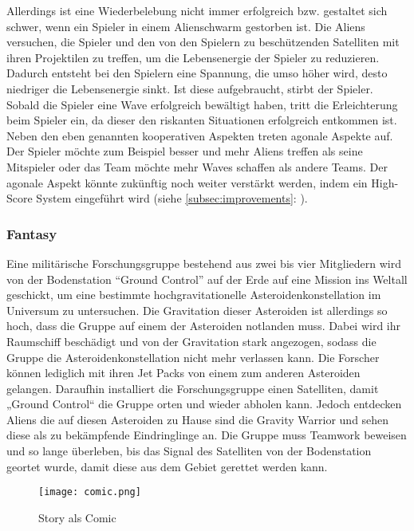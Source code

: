 \documentclass[11pt]{scrartcl}
\begin{document}
Allerdings ist eine Wiederbelebung nicht immer erfolgreich bzw. gestaltet sich schwer, wenn ein Spieler in einem Alienschwarm gestorben ist. Die Aliens versuchen, die Spieler und den von den Spielern zu beschützenden Satelliten mit ihren Projektilen zu treffen, um die Lebensenergie der Spieler zu reduzieren. Dadurch entsteht bei den Spielern eine Spannung, die umso höher wird, desto niedriger die Lebensenergie sinkt. Ist diese aufgebraucht, stirbt der Spieler. Sobald die Spieler eine Wave erfolgreich bewältigt haben, tritt die Erleichterung beim Spieler ein, da dieser den riskanten Situationen erfolgreich entkommen ist. Neben den eben genannten kooperativen Aspekten treten agonale Aspekte auf. Der Spieler möchte zum Beispiel besser und mehr Aliens treffen als seine Mitspieler oder das Team möchte mehr Waves schaffen als andere Teams. Der agonale Aspekt könnte zukünftig noch weiter verstärkt werden, indem ein High-Score System eingeführt wird (siehe \autoref{subsec:improvements}: ). 

\newpage
\subsubsection{Fantasy}
\label{subsec:fan}
Eine militärische Forschungsgruppe bestehend aus zwei bis vier Mitgliedern wird von der Bodenstation “Ground Control” auf der Erde auf eine Mission ins Weltall geschickt, um eine bestimmte hochgravitationelle Asteroidenkonstellation im Universum zu untersuchen. Die Gravitation dieser Asteroiden ist allerdings so hoch, dass die Gruppe auf einem der Asteroiden notlanden muss. Dabei wird ihr Raumschiff beschädigt und von der Gravitation stark angezogen, sodass die Gruppe die Asteroidenkonstellation nicht mehr verlassen kann. Die Forscher können lediglich mit ihren Jet Packs von einem zum anderen Asteroiden gelangen. Daraufhin installiert die Forschungsgruppe einen Satelliten, damit „Ground Control“ die Gruppe orten und wieder abholen kann. Jedoch entdecken Aliens die auf diesen Asteroiden zu Hause sind die Gravity Warrior und sehen diese als zu bekämpfende Eindringlinge an. Die Gruppe muss Teamwork beweisen und so lange überleben, bis das Signal des Satelliten von der Bodenstation geortet wurde, damit diese aus dem Gebiet gerettet werden kann. 

\begin{figure}[htp]
	\centering
	\texttt{[image: comic.png]}
	\caption{Story als Comic}
	\label{fig:comic}
\end{figure}
\end{document}
